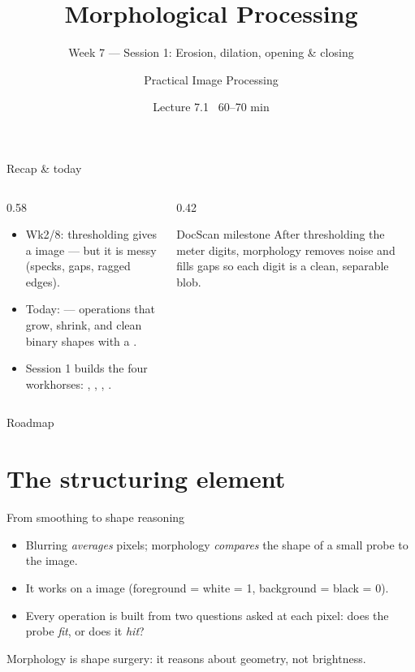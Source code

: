 \documentclass[10pt,aspectratio=169]{beamer}
\title{Morphological Processing}
\subtitle{Week 7 — Session 1: Erosion, dilation, opening \& closing}
\author{Practical Image Processing}
\date{Lecture 7.1 \textbullet\ 60--70 min}
\begin{document}
\maketitle

\begin{frame}{Recap \& today}
  \begin{columns}[T]
    \begin{column}{0.58\textwidth}
      \begin{itemize}
        \item Wk2/8: thresholding gives a  image — but it is messy (specks, gaps, ragged edges).
        \item \alert{Today:}  — operations that grow, shrink, and clean binary shapes with a .
        \item Session 1 builds the four workhorses: , , , .
      \end{itemize}
    \end{column}
    \begin{column}{0.42\textwidth}
      \begin{alertblock}{DocScan milestone}
        After thresholding the meter digits, morphology removes noise and fills gaps so each digit is a clean, separable blob.
      \end{alertblock}
    \end{column}
  \end{columns}
\end{frame}

\begin{frame}{Roadmap}\tableofcontents\end{frame}

\section{The structuring element}

\begin{frame}{From smoothing to shape reasoning}
  \begin{itemize}
    \item Blurring \emph{averages} pixels; morphology \emph{compares} the shape of a small probe to the image.
    \item It works on a  image (foreground = white = 1, background = black = 0).
    \item Every operation is built from two questions asked at each pixel: does the probe \emph{fit}, or does it \emph{hit}?
  \end{itemize}
  \begin{keyidea}{Morphology is shape surgery: it reasons about geometry, not brightness.}\end{keyidea}
\end{frame}
\end{document}
